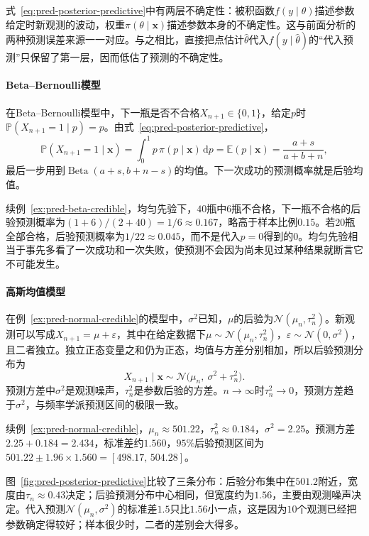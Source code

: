 式~\eqref{eq:pred-posterior-predictive}中有两层不确定性：被积函数$f(y\mid\theta)$描述参数给定时新观测的波动，权重$\pi(\theta\mid\bm x)$描述参数本身的不确定性。这与前面分析的两种预测误差来源一一对应。与之相比，直接把点估计$\hat\theta$代入$f(y\mid\hat\theta)$的“代入预测”只保留了第一层，因而低估了预测的不确定性。

\paragraph{Beta--Bernoulli模型}

在Beta--Bernoulli模型中，下一瓶是否不合格$X_{n+1}\in\{0,1\}$，给定$p$时$\mathbb P(X_{n+1}=1\mid p)=p$。由式~\eqref{eq:pred-posterior-predictive}，
\[
 \mathbb P(X_{n+1}=1\mid\bm x)=\int_0^1p\,\pi(p\mid\bm x)\,\mathrm dp=\mathbb E(p\mid\bm x)=\frac{a+s}{a+b+n},
\]
最后一步用到$\operatorname{Beta}(a+s,b+n-s)$的均值。下一次成功的预测概率就是后验均值。

\begin{example}[下一瓶不合格的概率]
\label{ex:pred-beta-predictive}
续例~\ref{ex:pred-beta-credible}，均匀先验下，$40$瓶中$6$瓶不合格，下一瓶不合格的后验预测概率为$(1+6)/(2+40)=1/6\approx0.167$，略高于样本比例$0.15$。若$20$瓶全部合格，后验预测概率为$1/22\approx0.045$，而不是代入$\hat p=0$得到的$0$。均匀先验相当于事先多看了一次成功和一次失败，使预测不会因为尚未见过某种结果就断言它不可能发生。
\end{example}

\paragraph{高斯均值模型}

在例~\ref{ex:pred-normal-credible}的模型中，$\sigma^2$已知，$\mu$的后验为$\mathcal N(\mu_n,\tau_n^2)$。新观测可以写成$X_{n+1}=\mu+\varepsilon$，其中在给定数据下$\mu\sim\mathcal N(\mu_n,\tau_n^2)$，$\varepsilon\sim\mathcal N(0,\sigma^2)$，且二者独立。独立正态变量之和仍为正态，均值与方差分别相加，所以后验预测分布为
\begin{equation}
 X_{n+1}\mid\bm x\sim\mathcal N\bigl(\mu_n,\ \sigma^2+\tau_n^2\bigr).
 \label{eq:pred-normal-posterior-predictive}
\end{equation}
预测方差中$\sigma^2$是观测噪声，$\tau_n^2$是参数后验的方差。$n\to\infty$时$\tau_n^2\to0$，预测方差趋于$\sigma^2$，与频率学派预测区间的极限一致。

\begin{example}[下一瓶的后验预测区间]
\label{ex:pred-normal-predictive}
续例~\ref{ex:pred-normal-credible}，$\mu_n\approx501.22$，$\tau_n^2\approx0.184$，$\sigma^2=2.25$。预测方差$2.25+0.184=2.434$，标准差约$1.560$，$95\%$后验预测区间为$501.22\pm1.96\times1.560=[498.17,\,504.28]$。

图~\ref{fig:pred-posterior-predictive}比较了三条分布：后验分布集中在$501.2$附近，宽度由$\tau_n\approx0.43$决定；后验预测分布中心相同，但宽度约为$1.56$，主要由观测噪声决定。代入预测$\mathcal N(\mu_n,\sigma^2)$的标准差$1.5$只比$1.56$小一点，这是因为$10$个观测已经把参数确定得较好；样本很少时，二者的差别会大得多。
\end{example}

